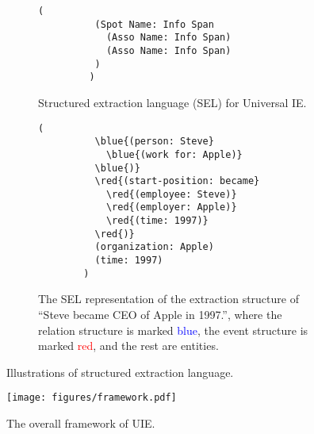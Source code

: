 \documentclass[11pt]{article}
\newcommand{\red}[1]{\textcolor{red}{#1}}
\newcommand{\blue}[1]{\textcolor{blue}{#1}}
\begin{document}
\begin{figure}[!tpb] 
  \centering

    \begin{subfigure}[b]{0.48\textwidth}
    \begin{minipage}{.48\textwidth}
      \centering
        \begin{Verbatim}[fontsize=\small]
        (
          (Spot Name: Info Span
            (Asso Name: Info Span)
            (Asso Name: Info Span)
          )
         )
        \end{Verbatim}
        \end{minipage}
        \caption{
            Structured extraction language (SEL) for Universal IE.
        }
        \label{fig:sel-illustration}
    \end{subfigure}
    
    \vfill
    
    \begin{subfigure}[b]{0.48\textwidth}
    \begin{minipage}{.96\textwidth}
      \centering
        \begin{Verbatim}[fontsize=\small,commandchars=\\\{\}]
        (
          \blue{(person: Steve}
            \blue{(work for: Apple)}
          \blue{)}
          \red{(start-position: became}
            \red{(employee: Steve)}
            \red{(employer: Apple)}
            \red{(time: 1997)}
          \red{)}
          (organization: Apple)
          (time: 1997)
        )
        \end{Verbatim}
        \end{minipage}
        \caption{
        The SEL representation of the extraction structure of ``Steve became CEO of Apple in 1997.'', where the relation structure is marked \blue{blue}, the event structure is marked \red{red}, and the rest are entities.
        }
        \label{fig:sel-example}
    \end{subfigure}
    
  \setlength{\belowcaptionskip}{-0.4cm}
\caption{
  Illustrations of structured extraction language.
}

\label{fig:sel}
\end{figure}
 
\begin{figure*}[!tpb]
    \centering
    \texttt{[image: figures/framework.pdf]}
    \caption{
        The overall framework of UIE.
        }
    \label{fig:full_model}
\end{figure*}
\end{document}
